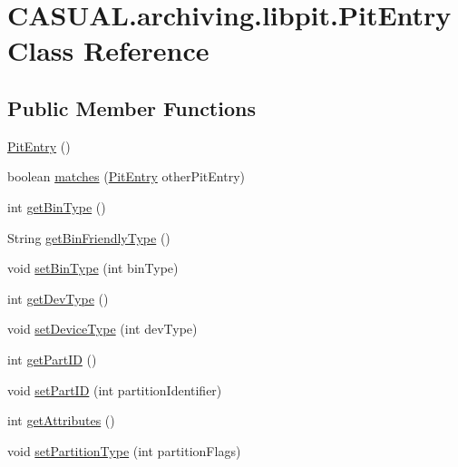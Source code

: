\hypertarget{classCASUAL_1_1archiving_1_1libpit_1_1PitEntry}{\section{C\-A\-S\-U\-A\-L.\-archiving.\-libpit.\-Pit\-Entry Class Reference}
\label{classCASUAL_1_1archiving_1_1libpit_1_1PitEntry}
}
\subsection*{Public Member Functions}
\begin{DoxyCompactItemize}
\item 
\hyperlink{classCASUAL_1_1archiving_1_1libpit_1_1PitEntry_a7dce9e238989b4c981768ea6c08ba56f}{Pit\-Entry} ()
\item 
boolean \hyperlink{classCASUAL_1_1archiving_1_1libpit_1_1PitEntry_a455c8c036ed50b32dbe97a51d63752aa}{matches} (\hyperlink{classCASUAL_1_1archiving_1_1libpit_1_1PitEntry}{Pit\-Entry} other\-Pit\-Entry)
\item 
int \hyperlink{classCASUAL_1_1archiving_1_1libpit_1_1PitEntry_a9c7cef6888b381fb5d5f39897ee8fa01}{get\-Bin\-Type} ()
\item 
String \hyperlink{classCASUAL_1_1archiving_1_1libpit_1_1PitEntry_a4c05687648451db18c7ce8a1462d18ea}{get\-Bin\-Friendly\-Type} ()
\item 
void \hyperlink{classCASUAL_1_1archiving_1_1libpit_1_1PitEntry_a77819d3aab0cb6b70e44b12d36797a46}{set\-Bin\-Type} (int bin\-Type)
\item 
int \hyperlink{classCASUAL_1_1archiving_1_1libpit_1_1PitEntry_a13406ab3d6569e82b987e286d356c3de}{get\-Dev\-Type} ()
\item 
void \hyperlink{classCASUAL_1_1archiving_1_1libpit_1_1PitEntry_a18143ffa6de82880e2b40d435f5936f5}{set\-Device\-Type} (int dev\-Type)
\item 
int \hyperlink{classCASUAL_1_1archiving_1_1libpit_1_1PitEntry_a1074e70a4d163f899275f49e83d06caa}{get\-Part\-I\-D} ()
\item 
void \hyperlink{classCASUAL_1_1archiving_1_1libpit_1_1PitEntry_a34f52910a0f2033816b50a7c42cf221f}{set\-Part\-I\-D} (int partition\-Identifier)
\item 
int \hyperlink{classCASUAL_1_1archiving_1_1libpit_1_1PitEntry_ac6eff6bba203a6c8ab45994b337f55b4}{get\-Attributes} ()
\item 
void \hyperlink{classCASUAL_1_1archiving_1_1libpit_1_1PitEntry_a6ef40cf9deab75de8c83086b38578353}{set\-Partition\-Type} (int partition\-Flags)

\end{DoxyCompactItemize}
